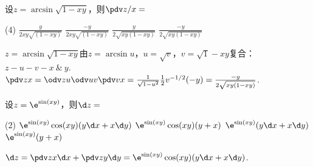\begin{problem}
    设$z=\arcsin\sqrt{1-xy}$，则$\pdv z/x=$
    \begin{tasks}(4)
        \task $\frac{y}{2xy\sqrt{(1-xy)}}$
        \task $\frac{-y}{2xy\sqrt{(1-xy)}}$
        \task $\frac{y}{2\sqrt{xy(1-xy)}}$
        \task[\true] $\frac{-y}{2\sqrt{xy(1-xy)}}$
    \end{tasks}
\end{problem}
\begin{solution}
    $z=\arcsin\sqrt{1-xy}$由$z=\arcsin u$，$u=\sqrt v$，$v=\sqrt 1-xy$复合：$z-u-v-x\ \&\ y$.
    $\pdv zx=\odv zu\odv uv\pdv vx=\frac{1}{\sqrt{1-u^2}}\frac12v^{-1/2}(-y)=\frac{-y}{2\sqrt{xy(1-xy)}}$.
\end{solution}

\begin{problem}
    设$z=\e^{\sin(xy)}$，则$\d z=$
    \begin{tasks}(2)
        \task[\true] $\e^{\sin(xy)}\cos(xy)(y\d x+x\d y)$
        \task $\e^{\sin(xy)}\cos(xy)(y+x)$
        \task $\e^{\sin(xy)}(y\d x+x\d y)$
        \task $\e^{\sin(xy)}(y+x)$
    \end{tasks}
\end{problem}
\begin{solution}
    $\d z=\pdv zx\d x+\pdv zy\d y=\e^{\sin(xy)}\cos(xy)(y\d x+x\d y)$.
\end{solution}

